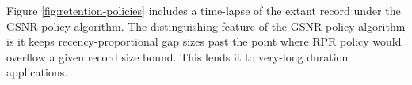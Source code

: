 Figure \ref{fig:retention-policies} includes a time-lapse of the extant record under the GSNR policy algorithm.
The distinguishing feature of the GSNR policy algorithm is it keeps recency-proportional gap sizes past the point where RPR policy would overflow a given record size bound.
This lends it to very-long duration applications.

% 
% 
% 

% 
% 

